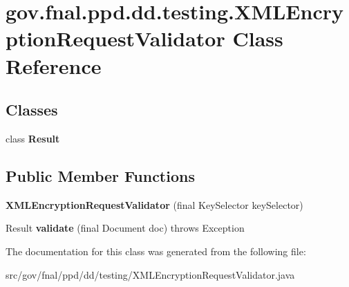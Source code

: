 \hypertarget{classgov_1_1fnal_1_1ppd_1_1dd_1_1testing_1_1XMLEncryptionRequestValidator}{\section{gov.\-fnal.\-ppd.\-dd.\-testing.\-X\-M\-L\-Encryption\-Request\-Validator Class Reference}
\label{classgov_1_1fnal_1_1ppd_1_1dd_1_1testing_1_1XMLEncryptionRequestValidator}
}
\subsection*{Classes}
\begin{DoxyCompactItemize}
\item 
class {\bfseries Result}
\end{DoxyCompactItemize}
\subsection*{Public Member Functions}
\begin{DoxyCompactItemize}
\item 
\hypertarget{classgov_1_1fnal_1_1ppd_1_1dd_1_1testing_1_1XMLEncryptionRequestValidator_ada3900918e84173b1c428741f64d2990}{{\bfseries X\-M\-L\-Encryption\-Request\-Validator} (final Key\-Selector key\-Selector)}\label{classgov_1_1fnal_1_1ppd_1_1dd_1_1testing_1_1XMLEncryptionRequestValidator_ada3900918e84173b1c428741f64d2990}

\item 
\hypertarget{classgov_1_1fnal_1_1ppd_1_1dd_1_1testing_1_1XMLEncryptionRequestValidator_a2e891769be8cb9688e2f42032f16feaf}{Result {\bfseries validate} (final Document doc)  throws Exception }\label{classgov_1_1fnal_1_1ppd_1_1dd_1_1testing_1_1XMLEncryptionRequestValidator_a2e891769be8cb9688e2f42032f16feaf}

\end{DoxyCompactItemize}


The documentation for this class was generated from the following file\-:\begin{DoxyCompactItemize}
\item 
src/gov/fnal/ppd/dd/testing/X\-M\-L\-Encryption\-Request\-Validator.\-java\end{DoxyCompactItemize}

